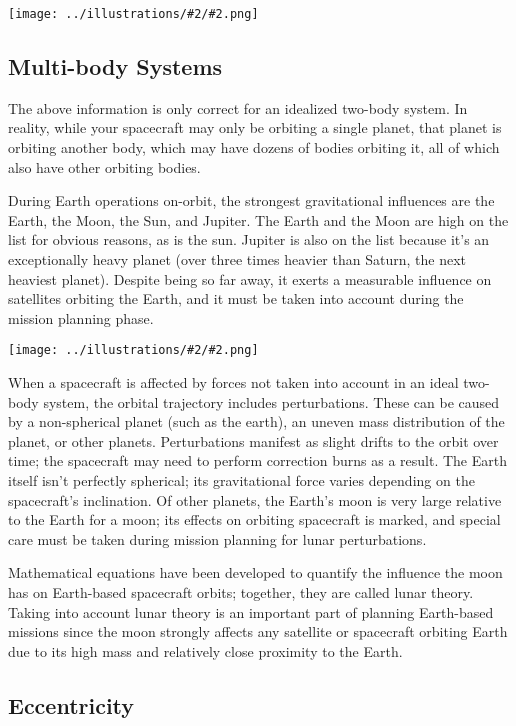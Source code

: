 \documentclass[oneside,a5paper]{book}
\newcommand{\widthillustration}[2]{{\centering\texttt{[image: ../illustrations/\#2/\#2.png]}}}
\newcommand{\illustration}[1]{\widthillustration{\linewidth}{#1}}
\begin{document}
\illustration{kepler-second-law}

\subsection{Multi-body Systems}

The above information is only correct for an idealized two-body
system. In reality, while your spacecraft may only be orbiting a
single planet, that planet is orbiting another body, which may have
dozens of bodies orbiting it, all of which also have other orbiting
bodies.

During Earth operations on-orbit, the strongest gravitational
influences are the Earth, the Moon, the Sun, and Jupiter. The Earth
and the Moon are high on the list for obvious reasons, as is the
sun. Jupiter is also on the list because it’s an exceptionally heavy
planet (over three times heavier than Saturn, the next heaviest
planet). Despite being so far away, it exerts a measurable influence
on satellites orbiting the Earth, and it must be taken into account
during the mission planning phase.

\illustration{perturbations}

When a spacecraft is affected by forces not taken into account in an
ideal two-body system, the orbital trajectory includes
perturbations. These can be caused by a non-spherical planet (such as
the earth), an uneven mass distribution of the planet, or other
planets. Perturbations manifest as slight drifts to the orbit over
time; the spacecraft may need to perform correction burns as a
result. The Earth itself isn’t perfectly spherical; its gravitational
force varies depending on the spacecraft’s inclination. Of other
planets, the Earth’s moon is very large relative to the Earth for a
moon; its effects on orbiting spacecraft is marked, and special care
must be taken during mission planning for lunar perturbations.

Mathematical equations have been developed to quantify the influence
the moon has on Earth-based spacecraft orbits; together, they are
called lunar theory. Taking into account lunar theory is an important
part of planning Earth-based missions since the moon strongly affects
any satellite or spacecraft orbiting Earth due to its high mass and
relatively close proximity to the Earth.

\subsection{Eccentricity}
\end{document}
